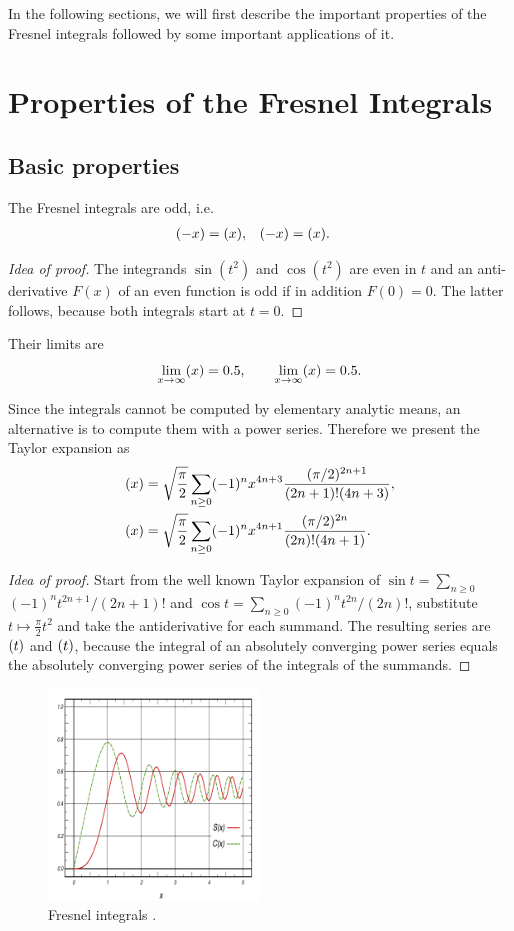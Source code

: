 \documentclass[12pt]{article}
\let\C=\relax
\DeclareMathOperator\C{C} %
\def\d#1{{\,\ud#1\,}}
\let\S=\relax
\DeclareMathOperator\S{S} %
\begin{document}
In the following sections, we will first describe the important properties of the Fresnel integrals followed by some important applications of it.

\section{Properties of the Fresnel Integrals}
\subsection{Basic properties}
The Fresnel integrals are odd, i.e.
\begin{align*}
	\S(-x) &= \S(x), & \C(-x) &= \C(x).
\end{align*}
\begin{proof}[Idea of proof]  The integrands $\sin(t^2)$ and $\cos(t^2)$ are even in $t$ and an anti-derivative $F(x)$ of an even function is odd if in addition $F(0)=0$.  The latter follows, because both integrals start at $t=0$.
\end{proof}

Their limits are
\[  \lim_{x\to\infty} \S(x) = 0.5,\qquad  \lim_{x\to\infty} \C(x) = 0.5.
\]

Since the integrals cannot be computed by elementary analytic means, an alternative is to compute them with a power series.  Therefore we present the Taylor expansion as
\begin{align*}
  \S(x) &= \sqrt{\frac\pi2}\sum_{n\ge0} (-1)^nx^{4n+3}\frac{(\pi/2)^{2n+1}}{(2n+1)!(4n+3)}, \\
  \C(x) &= \sqrt{\frac\pi2}\sum_{n\ge0} (-1)^nx^{4n+1}\frac{(\pi/2)^{2n}}{(2n)!(4n+1)}.
\end{align*}
\begin{proof}[Idea of proof]  Start from the well known Taylor expansion of $\sin t = \sum_{n\ge0}$ $(-1)^n t^{2n+1}/(2n+1)!$ and $\cos t = \sum_{n\ge0} (-1)^nt^{2n}/(2n)!$, substitute $t\mapsto \tfrac\pi2 t^2$ and take the antiderivative for each summand.  The resulting series are $\S(t)$ and $\C(t)$, because the integral of an absolutely converging power series equals the absolutely converging power series of the integrals of the summands.
\end{proof}

\begin{figure}[h!]
	\centering
	\includegraphics[width=0.5\textwidth]{Fresnel-Integrals-(Normalised).png}
	\caption{Fresnel integrals \cite{wiki}.}
\end{figure}
\end{document}
